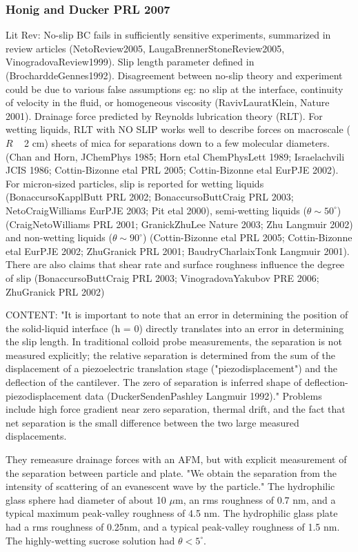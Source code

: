\documentclass[twocolumn]{article}
\begin{document}
\subsubsection*{Honig and Ducker PRL 2007}
Lit Rev: No-slip BC fails in sufficiently sensitive experiments, summarized in review articles (NetoReview2005, LaugaBrennerStoneReview2005, VinogradovaReview1999). Slip length parameter defined in (BrocharddeGennes1992). Disagreement between no-slip theory and experiment could be due to various false assumptions eg: no slip at the interface, continuity of velocity in the fluid, or homogeneous viscosity (RavivLauratKlein, Nature 2001). Drainage force predicted by Reynolds lubrication theory (RLT). For wetting liquids,  RLT with NO SLIP works well to describe forces on macroscale ($R$ ~ 2 cm) sheets of mica for separations  down to a few molecular diameters. (Chan and Horn, JChemPhys 1985; Horn etal ChemPhysLett 1989; Israelachvili JCIS 1986; Cottin-Bizonne etal PRL 2005; Cottin-Bizonne etal EurPJE 2002).  For micron-sized particles, slip is reported for wetting liquids (BonaccursoKapplButt PRL 2002; BonaccursoButtCraig PRL 2003; NetoCraigWilliams EurPJE 2003; Pit etal 2000), semi-wetting liquids ($\theta \sim 50^{\circ} $) (CraigNetoWilliams PRL 2001; GranickZhuLee Nature 2003; Zhu Langmuir 2002) and non-wetting liquids ($\theta \sim 90^{\circ}$) (Cottin-Bizonne etal PRL 2005; Cottin-Bizonne etal EurPJE 2002; ZhuGranick PRL 2001; BaudryCharlaixTonk Langmuir 2001). There are also claims that shear rate and surface roughness influence the degree of slip (BonaccursoButtCraig PRL 2003; VinogradovaYakubov PRE 2006; ZhuGranick PRL 2002)

CONTENT: "It is important to note that an error in determining the position of the solid-liquid interface (h = 0) directly translates into an error in determining the slip length. In traditional colloid probe measurements, the separation is not measured explicitly; the relative separation is determined from the sum of the displacement of a piezoelectric translation stage ("piezodisplacement") and the deflection of the cantilever. The zero of separation is inferred shape of deflection-piezodisplacement data (DuckerSendenPashley Langmuir 1992)." Problems include high force gradient near zero separation, thermal drift, and the fact that net separation is the small difference between the two large measured displacements.

They remeasure drainage forces with an AFM, but with explicit measurement of the separation between particle and plate. "We obtain the separation from the intensity of scattering of an evanescent wave by the particle." The hydrophilic glass sphere had diameter of about 10 $\mu$m, an rms roughness of 0.7 nm, and a typical maximum peak-valley roughness of 4.5 nm. The hydrophilic glass plate had a rms roughness of 0.25nm, and a typical peak-valley roughness of 1.5 nm.  The highly-wetting sucrose solution had $\theta < 5^{\circ} $. 
 
\end{document}

